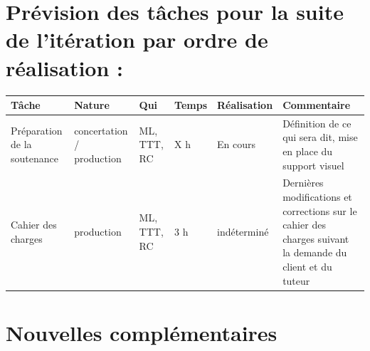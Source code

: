 \documentclass[12pt,titlepage,french]{article}
\begin{document}
\section{Prévision des tâches pour la suite de l'itération par ordre de réalisation :}

\noindent\begin{tabularx}{17cm}{|p{2.5cm}|p{2.5cm}|p{1cm}|p{1.5cm}|p{2.5cm}|X|}
    \hline
    \textbf{Tâche} & \textbf{Nature} & \textbf{Qui} & \textbf{Temps} & \textbf{Réalisation} & \textbf{Commentaire} \\
    \hline
    Préparation de la soutenance & concertation / production & ML, TTT, RC & X h & En cours & Définition de ce qui sera dit, mise en place du support visuel\\
    \hline
    Cahier des charges & production & ML, TTT, RC & 3 h & indéterminé & Dernières modifications et corrections sur le cahier des charges suivant la demande du client et du tuteur \\
    \hline
\end{tabularx}
\section{Nouvelles complémentaires}
\end{document}
